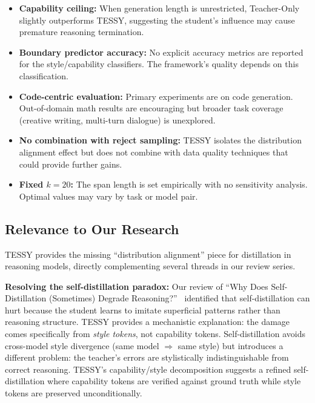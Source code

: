 \documentclass[11pt]{article}
\begin{document}
\begin{itemize}
    \item \textbf{Capability ceiling:} When generation length is unrestricted, Teacher-Only slightly outperforms TESSY, suggesting the student's influence may cause premature reasoning termination.

    \item \textbf{Boundary predictor accuracy:} No explicit accuracy metrics are reported for the style/capability classifiers. The framework's quality depends on this classification.

    \item \textbf{Code-centric evaluation:} Primary experiments are on code generation. Out-of-domain math results are encouraging but broader task coverage (creative writing, multi-turn dialogue) is unexplored.

    \item \textbf{No combination with reject sampling:} TESSY isolates the distribution alignment effect but does not combine with data quality techniques that could provide further gains.

    \item \textbf{Fixed $k = 20$:} The span length is set empirically with no sensitivity analysis. Optimal values may vary by task or model pair.
\end{itemize}

\subsection{Relevance to Our Research}

TESSY provides the missing ``distribution alignment'' piece for distillation in reasoning models, directly complementing several threads in our review series.

\textbf{Resolving the self-distillation paradox:} Our review of ``Why Does Self-Distillation (Sometimes) Degrade Reasoning?''~\cite{selfdistill} identified that self-distillation can hurt because the student learns to imitate superficial patterns rather than reasoning structure. TESSY provides a mechanistic explanation: the damage comes specifically from \textit{style tokens}, not capability tokens. Self-distillation avoids cross-model style divergence (same model $\Rightarrow$ same style) but introduces a different problem: the teacher's errors are stylistically indistinguishable from correct reasoning. TESSY's capability/style decomposition suggests a refined self-distillation where capability tokens are verified against ground truth while style tokens are preserved unconditionally.
\end{document}
